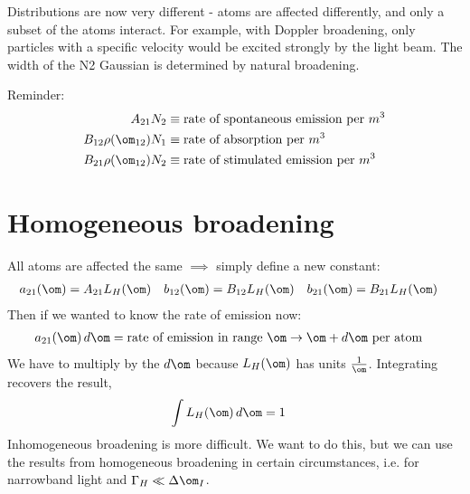 \documentclass[a4paper, 11pt, normalem]{report}
\begin{document}
\begin{example}
\begin{enumerate}
\begin{figure}[H]
        \end{figure}
        Distributions are now very different - atoms are affected differently, and only a subset of the atoms interact.
        For example, with Doppler broadening, only particles with a specific velocity would be excited strongly by the light beam. 
        The width of the N2 Gaussian is determined by natural broadening. 
\end{enumerate}
\end{example}
Reminder:
\begin{align}
    A_{21}N_2 &\equiv \text{rate of spontaneous emission per }m^3 \\
    B_{12}\rho(\om_{12})N_1 &\equiv \text{rate of absorption per }m^3 \\
    B_{21}\rho(\om_{12})N_2 &\equiv \text{rate of stimulated emission per }m^3
\end{align}
\section{Homogeneous broadening}
All atoms are affected the same $\implies$ simply define a new constant:
\begin{align}
    a_{21}(\om) &= A_{21}L_H(\om) & b_{12}(\om) &= B_{12}L_H(\om) & b_{21}(\om) &= B_{21}L_H(\om)
\end{align}
Then if we wanted to know the rate of emission now:
\begin{align}
    a_{21}(\om)\,d\om &= \text{rate of emission in range $\om\to\om+d\om$ per atom} 
\end{align}
We have to multiply by the $d\om$ because $L_H(\om)$ has units $\frac{1}{\om}$.
Integrating recovers the result,
\begin{align}
    \int L_H(\om)\,d\om &= 1
\end{align}
Inhomogeneous broadening is more difficult. 
We want to do this, but we can use the results from homogeneous broadening in certain circumstances, i.e. for narrowband light and $\Gamma_H \ll \Delta\om_I$.
\end{document}

